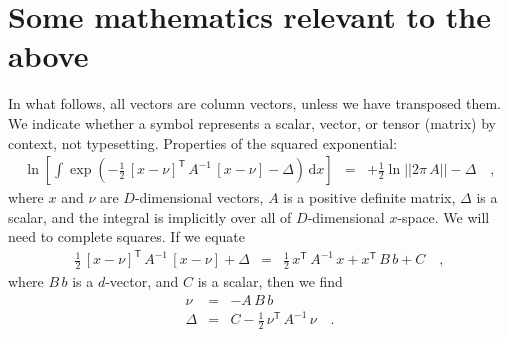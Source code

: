 \documentclass[manuscript, letterpaper]{aastex6}
\newcommand{\project}[1]{\textsl{#1}}
\newcommand{\acronym}[1]{{\small{#1}}}
\newcommand{\apogee}{\project{\acronym{APOGEE}}}
\newcommand{\dd}{\mathrm{d}}
\newcommand{\transp}[1]{{#1}^{\!\mathsf{T}}}
\newcommand{\inv}[1]{{#1}^{-1}}
\begin{document}




\appendix
\section{Some mathematics relevant to the above}

In what follows, all vectors are column vectors, unless we have transposed them.
We indicate whether a symbol represents a scalar, vector, or tensor
(matrix) by context, not typesetting.
Properties of the squared exponential:
\begin{eqnarray}
  \ln\left[\int\exp(-\frac{1}{2}\,\transp{[x-\nu]}\,\inv{A}\,[x-\nu] - \Delta)\,\dd x\right]
  &=& +\frac{1}{2}\ln ||2\pi\,A|| -\Delta
  \quad ,
\end{eqnarray}
where $x$ and $\nu$ are $D$-dimensional vectors, $A$ is a positive definite
matrix, $\Delta$ is a scalar, and the integral is implicitly over all
of $D$-dimensional $x$-space.
We will need to complete squares.
If we equate
\begin{eqnarray}
  \frac{1}{2}\,\transp{[x-\nu]}\,\inv{A}\,[x-\nu] + \Delta
  &=& \frac{1}{2}\,\transp{x}\,\inv{A}\,x + \transp{x}\,B\,b + C
  \quad ,
\end{eqnarray}
where $B\,b$ is a $d$-vector, and $C$ is a scalar, then we find
\begin{eqnarray}
  \nu &=& -A\,B\,b
  \\
  \Delta & = & C - \frac{1}{2}\,\transp{\nu}\,\inv{A}\,\nu
  \quad .
\end{eqnarray}
\end{document}
